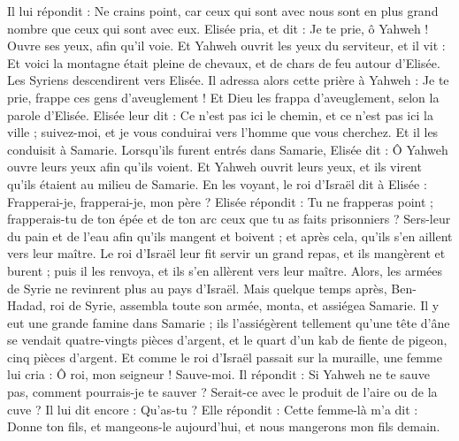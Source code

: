 \begin{multicols}{2}
Il lui répondit : Ne crains point, car ceux qui sont avec nous sont en plus grand nombre que ceux qui sont avec eux.
Elisée pria, et dit : Je te prie, ô Yahweh ! Ouvre ses yeux, afin qu’il voie. Et Yahweh ouvrit les yeux du serviteur, et il vit : Et voici la montagne était pleine de chevaux, et de chars de feu autour d’Elisée.
Les Syriens descendirent vers Elisée. Il adressa alors cette prière à Yahweh : Je te prie, frappe ces gens d’aveuglement ! Et Dieu les frappa d’aveuglement, selon la parole d’Elisée.
Elisée leur dit : Ce n’est pas ici le chemin, et ce n’est pas ici la ville ; suivez-moi, et je vous conduirai vers l’homme que vous cherchez. Et il les conduisit à Samarie.
Lorsqu’ils furent entrés dans Samarie, Elisée dit : Ô Yahweh ouvre leurs yeux afin qu’ils voient. Et Yahweh ouvrit leurs yeux, et ils virent qu’ils étaient au milieu de Samarie.
En les voyant, le roi d’Israël dit à Elisée : Frapperai-je, frapperai-je, mon père ?
Elisée répondit : Tu ne frapperas point ; frapperais-tu de ton épée et de ton arc ceux que tu as faits prisonniers ? Sers-leur du pain et de l’eau afin qu’ils mangent et boivent ; et après cela, qu’ils s’en aillent vers leur maître.
Le roi d’Israël leur fit servir un grand repas, et ils mangèrent et burent ; puis il les renvoya, et ils s’en allèrent vers leur maître. Alors, les armées de Syrie ne revinrent plus au pays d’Israël.
Mais quelque temps après, Ben-Hadad, roi de Syrie, assembla toute son armée, monta, et assiégea Samarie.
Il y eut une grande famine dans Samarie ; ils l’assiégèrent tellement qu’une tête d’âne se vendait quatre-vingts pièces d’argent, et le quart d’un kab de fiente de pigeon, cinq pièces d’argent.
Et comme le roi d’Israël passait sur la muraille, une femme lui cria : Ô roi, mon seigneur ! Sauve-moi.
Il répondit : Si Yahweh ne te sauve pas, comment pourrais-je te sauver ? Serait-ce avec le produit de l’aire ou de la cuve ?
Il lui dit encore : Qu’as-tu ? Elle répondit : Cette femme-là m’a dit : Donne ton fils, et mangeons-le aujourd’hui, et nous mangerons mon fils demain.

\end{multicols}
